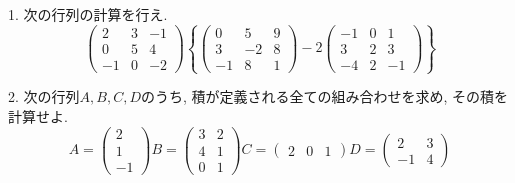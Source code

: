 \documentclass[dvipdfmx,a4paper,11pt]{article}
\theoremstyle{definition}
\begin{document}
1.  次の行列の計算を行え.
 $$
 \begin{pmatrix}
 2 &3&-1 \\
 0&5&4\\
 -1&0&-2
 \end{pmatrix}
 \left\{
 \begin{pmatrix}
 0 &5&9 \\
 3&-2&8\\
 -1&8&1
 \end{pmatrix}
 - 2
  \begin{pmatrix}
 -1 &0&1 \\
 3&2&3\\
 -4&2&-1
 \end{pmatrix}
\right\}
 $$
  
 2. 次の行列$A,B,C,D$のうち, 積が定義される全ての組み合わせを求め, その積を計算せよ.
 $$
  A=\begin{pmatrix}
 2 \\ 1\\-1
 \end{pmatrix} 
B= \begin{pmatrix}
 3 &2\\
 4&1\\
 0&1
 \end{pmatrix} 
 C=
  \begin{pmatrix}
 2 &0&1 
 \end{pmatrix}
 D= \begin{pmatrix}
 2&3\\
 -1&4
 \end{pmatrix}
 $$


 
\end{document}
